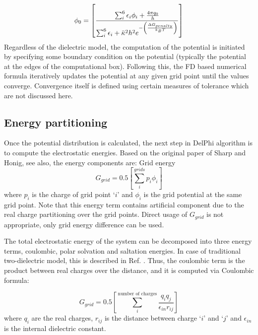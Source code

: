 \documentclass[9pt,tutorial]{livecoms}
\begin{document}
\begin{equation}
    \phi_0 = 
    \left[ 
        \frac{\sum_i^6{\epsilon_i\phi_i } + 
                \frac{4\pi q_0}{h}
             }
             {\sum_i^6{\epsilon_i} + \Bar{\kappa}^2h^2e^{-\left(\frac{\Delta G_{penalty}}{k_BT}\right)}}
    \right]
\end{equation}
Regardless of the dielectric model, the computation of the potential is initiated by specifying  some boundary condition on the potential (typically the potential at the edges of the computational box). Following this, the FD based numerical formula iteratively updates the potential at any given grid point until the values converge. Convergence itself is defined using certain measures of tolerance which are not discussed here. 
 
\subsection{Energy partitioning}
Once the potential distribution is calculated, the next step in DelPhi algorithm is to compute the electrostatic energies. Based on the original paper of Sharp and Honig\cite{sharp1990electrostatic}, see also\cite{rocchia2001extending}, the energy components are:
Grid energy
\begin{equation}
    G_{grid} = 0.5 \left[ \sum_i^{grids}{p_i\phi_i} \right]
\end{equation}
where $ p_i $ is the charge of grid point ‘$ i $’ and $ \phi_i $ is the grid potential at the same grid point. Note that this energy term contains artificial component due to the real charge partitioning over the grid points. Direct usage of $ G_{grid} $ is not appropriate, only grid energy difference can be used.

The total electrostatic energy of the system can be decomposed into three energy terms\cite{rocchia2001extending}, coulombic, polar solvation and saltation energies. In case of traditional two-dielectric model, this is described in Ref. \cite{rocchia2001extending}. Thus, the coulombic term is the product between real charges over the distance, and it is computed via Coulombic formula:

\begin{equation}
    G_{grid} = 0.5 \left[ \sum_i^{\text{number of charges}}{\frac{q_i q_j}{\epsilon_{in}r_{ij}}} \right]
\end{equation}	
where $ q_i $ are the real charges, $r_{ij} $ is the distance between charge ‘$i$’ and ‘$j$’ and $ \epsilon_{in} $ is the internal dielectric constant. 
\end{document}
